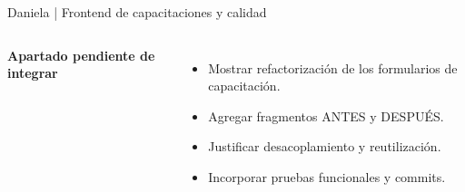\begin{frame}{Daniela | Frontend de capacitaciones y calidad}
\begin{columns}[T,onlytextwidth]
{\large\bfseries Apartado pendiente de integrar}\par\vspace{0.26cm}
\begin{itemize}\setlength\itemsep{0.22cm}
\item Mostrar refactorización de los formularios de capacitación.
\item Agregar fragmentos ANTES y DESPUÉS.
\item Justificar desacoplamiento y reutilización.
\item Incorporar pruebas funcionales y commits.
\end{itemize}
\end{columns}
\end{frame}
